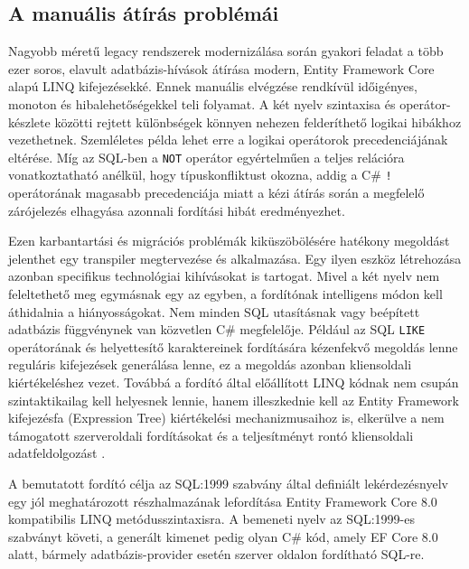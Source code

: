 \documentclass[a4paper,12pt]{article}
\begin{document}
\subsection{A manuális átírás problémái}

Nagyobb méretű legacy rendszerek modernizálása során gyakori feladat a több ezer soros, elavult adatbázis-hívások átírása modern, Entity Framework Core alapú LINQ kifejezésekké. Ennek manuális elvégzése rendkívül időigényes, monoton és hibalehetőségekkel teli folyamat. A két nyelv szintaxisa és operátor-készlete közötti rejtett különbségek könnyen nehezen felderíthető logikai hibákhoz vezethetnek. Szemléletes példa lehet erre a logikai operátorok precedenciájának eltérése. Míg az SQL-ben a \texttt{NOT} operátor egyértelműen a teljes relációra vonatkoztatható anélkül, hogy típuskonfliktust okozna, addig a C\# \texttt{!} operátorának magasabb precedenciája miatt a kézi átírás során a megfelelő zárójelezés elhagyása azonnali fordítási hibát eredményezhet.

Ezen karbantartási és migrációs problémák kiküszöbölésére hatékony megoldást jelenthet egy transpiler megtervezése és alkalmazása. Egy ilyen eszköz létrehozása azonban specifikus technológiai kihívásokat is tartogat. Mivel a két nyelv nem feleltethető meg egymásnak egy az egyben, a fordítónak intelligens módon kell áthidalnia a hiányosságokat. Nem minden SQL utasításnak vagy beépített adatbázis függvénynek van közvetlen C\# megfelelője. Például az SQL \texttt{LIKE} operátorának és helyettesítő karaktereinek fordítására kézenfekvő megoldás lenne reguláris kifejezések generálása lenne, ez a megoldás azonban kliensoldali kiértékeléshez vezet. Továbbá a fordító által előállított LINQ kódnak nem csupán szintaktikailag kell helyesnek lennie, hanem illeszkednie kell az Entity Framework kifejezésfa (Expression Tree) kiértékelési mechanizmusaihoz is, elkerülve a nem támogatott szerveroldali fordításokat és a teljesítményt rontó kliensoldali adatfeldolgozást \cite{nmorph2023}.

A bemutatott fordító célja az SQL:1999 szabvány által definiált lekérdezésnyelv egy jól meghatározott részhalmazának lefordítása Entity Framework Core 8.0 kompatibilis LINQ metódusszintaxisra. A bemeneti nyelv az SQL:1999-es szabványt követi, a generált kimenet pedig olyan C\# kód, amely EF Core 8.0 alatt, bármely adatbázis-provider esetén szerver oldalon fordítható SQL-re.
\end{document}
